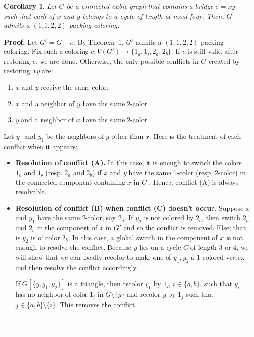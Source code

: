 \documentclass[12pt, oneside]{scrartcl}
\newtheorem{corollary}{Corollary}%
\newenvironment{proof}[1][Proof]{\textbf{#1.} }{\ \rule{0.5em}{0.5em}}
\begin{document}
\begin{corollary}
Let $G$ be a connected cubic graph that contains a bridge $e = xy$ such that each of $x$ and $y$ belongs to a cycle of length at most four. 
Then, $G$ admits a $(1,1,2,2)$-packing coloring.
\end{corollary}
\begin{proof}
Let $G' = G - e$. By Theorem~1, $G'$ admits a $(1,1,2,2)$-packing coloring. Fix such a coloring $c : V(G') \to \{1_a,1_b,2_a,2_b\}$. If $c$ is still valid after restoring $e$, we are done. Otherwise, the only possible conflicts in $G$ created by restoring $xy$ are:
\begin{enumerate}
  \item[\textup{(A)}] $x$ and $y$ receive the same color;
  \item[\textup{(B)}] $x$ and a neighbor of $y$ have the same $2$-color;
  \item[\textup{(C)}] $y$ and a neighbor of $x$ have the same $2$-color.
\end{enumerate}
 Let $y_1$ and $y_2$ be the neighbors of $y$ other than $x$. Here is the treatment of each conflict when it appears:\begin{itemize}
 \item \textbf{Resolution of conflict (A).}
 In this case, it is enough to switch the colors $1_a$ and $1_b$ (resp. $2_a$ and $2_b$) if $x$ and $y$ have the same 1-color (resp. 2-color) in the connected component containing $x$ in $G'$. Hence, conflict (A) is always resolvable.
 
\item \textbf{Resolution of conflict (B) when conflict (C) doesn't occur.} 
 Suppose $x$ and $y_1$ have the same 2-color, say $2_a$. If $y_2$ is not colored by $2_b$, then switch $2_a$ and $2_b$ in the  component of $x$ in $G'$ and so the conflict is removed. Else; that is $y_2$ is of color $2_b$. In this case, a global switch in the component of $x$ is not enough to resolve the conflict. Because $y$ lies on a cycle $C$ of length $3$ or $4$, we will show that we can locally recolor to make one of $y_1,y_2$ a $1$-colored vertex and then resolve the conflict accordingly.

If $G[\{y,y_1,y_2\}]$ is a triangle, then recolor $y_1$ by $1_i$, $i\in\{a,b\}$, such that $y_i$ has no neighbor of color $1_i$ in $G\setminus \{y\}$ and recolor $y$ by $1_j$ such that $j\in \{a,b\}\setminus\{i\}$. This removes the conflict. 


\end{itemize}
\end{proof}
\end{document}
